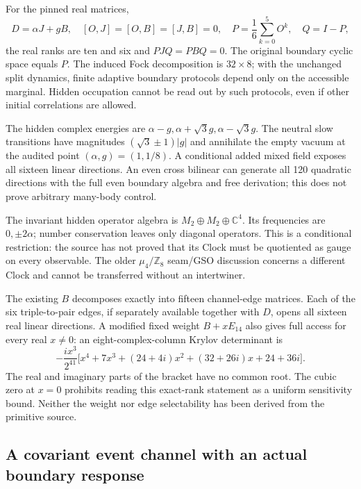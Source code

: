 For the pinned real matrices,
\[
 D=\alpha J+gB,\quad [O,J]=[O,B]=[J,B]=0,\quad
 P=\frac16\sum_{k=0}^5O^k,\quad Q=I-P,
\]
the real ranks are ten and six and $PJQ=PBQ=0$. The original boundary
cyclic space equals $P$. The induced Fock decomposition is $32\times8$;
with the unchanged split dynamics, finite adaptive boundary protocols
depend only on the accessible marginal. Hidden occupation cannot be read
out by such protocols, even if other initial correlations are allowed.

The hidden complex energies are
$\alpha-g,\alpha+\sqrt3g,\alpha-\sqrt3g$. The neutral slow transitions
have magnitudes $(\sqrt3\pm1)|g|$ and annihilate the empty vacuum at the
audited point $(\alpha,g)=(1,1/8)$. A conditional added mixed field exposes
all sixteen linear directions. An even cross bilinear can generate all
120 quadratic directions with the full even boundary algebra and free
derivation; this does not prove arbitrary many-body control.

The invariant hidden operator algebra is
$M_2\oplus M_2\oplus\mathbb C^4$. Its frequencies are $0,\pm2\alpha$;
number conservation leaves only diagonal operators. This is a conditional
restriction: the source has not proved that its Clock must be quotiented
as gauge on every observable. The older $\mu_4/\mathbb Z_8$ seam/GSO
discussion concerns a different Clock and cannot be transferred without
an intertwiner.

The existing $B$ decomposes exactly into fifteen channel-edge matrices.
Each of the six triple-to-pair edges, if separately available together
with $D$, opens all sixteen real linear directions. A modified fixed
weight $B+xE_{14}$ also gives full access for every real $x\ne0$: an
eight-complex-column Krylov determinant is
\[
 -\frac{ix^3}{2^{41}}
 \bigl[x^4+7x^3+(24+4i)x^2+(32+26i)x+24+36i\bigr].
\]
The real and imaginary parts of the bracket have no common root.
The cubic zero at $x=0$ prohibits reading this exact-rank statement as
a uniform sensitivity bound. Neither the weight nor edge selectability
has been derived from the primitive source.

\subsection{A covariant event channel with an actual boundary response}

